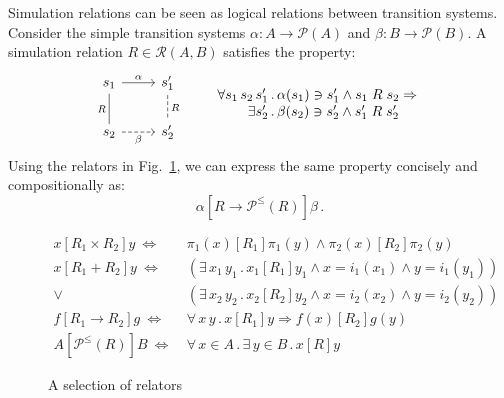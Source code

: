 \documentclass[acmsmall,authordraft]{acmart}
\newcommand{\ifr}[1]{\mathrel{[{#1}]}}
\begin{document}
\begin{example} \label{ex:simrel}
Simulation relations can be seen as
logical relations between transition systems.
Consider the simple transition systems
$\alpha : A \rightarrow \mathcal{P}(A)$ and
$\beta : B \rightarrow \mathcal{P}(B)$.
A simulation relation $R \in \mathcal{R}(A, B)$
satisfies the property:
\begin{equation}
  \begin{tikzcd}
    s_1 \arrow[r, "\alpha"]
        \arrow[d, dash, "R"'] &
    s_1' \arrow[d, dashed, dash, "R"] \\
    s_2 \arrow[r, dashed, "\beta"'] &
    s_2'
  \end{tikzcd}
  \qquad
  \label{eqn:simrel}
  \begin{array}{r@{\,.\,}l}
    \forall s_1 \, s_2 \, s_1' &
      \alpha(s_1) \ni s_1' \wedge s_1 \mathrel{R} s_2 \Rightarrow \\
    \exists s_2' &
      \beta(s_2) \ni s_2' \wedge s_1' \mathrel{R} s_2'
  \end{array}
\end{equation}
Using the relators in Fig.~\ref{fig:relators},
we can express the same property
concisely and compositionally as:
\[
  \alpha \ifr{R \rightarrow \mathcal{P}^\le(R)} \beta \,.
\]
\end{example}

\begin{figure} %
  \begin{align*}
    x \ifr{R_1 \times R_2} y \ \Leftrightarrow\  &
      \pi_1(x) \ifr{R_1} \pi_1(y) \wedge
      \pi_2(x) \ifr{R_2} \pi_2(y) \\
    x \ifr{R_1 + R_2} y \ \Leftrightarrow\  &
      (\exists \, x_1 \, y_1 \,.\,
        x_1 \ifr{R_1} y_1 \wedge
        x = i_1(x_1) \wedge
        y = i_1(y_1)) \\ \vee\ &
      (\exists \, x_2 \, y_2 \,.\,
        x_2 \ifr{R_2} y_2 \wedge
        x = i_2(x_2) \wedge
        y = i_2(y_2)) \\
    f \ifr{R_1 \rightarrow R_2} g \ \Leftrightarrow\  &
      \forall \, x \, y \,.\,
        x \ifr{R_1} y \Rightarrow
        f(x) \ifr{R_2} g(y) \\
    A \ifr{\mathcal{P}^\le(R)} B \ \Leftrightarrow\  &
      \forall \, x \in A \,.\,
      \exists \, y \in B \,.\,
      x \ifr{R} y
  \end{align*}
  \caption{A selection of relators}
  \label{fig:relators}
\end{figure}
\end{document}
